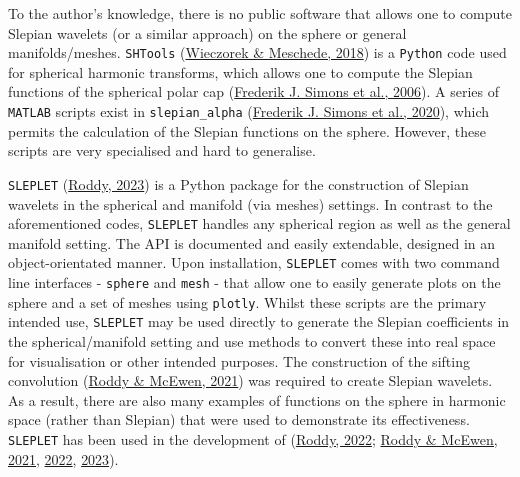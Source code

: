 \documentclass[
]{article}
\begin{document}
To the author's knowledge, there is no public software that allows one
to compute Slepian wavelets (or a similar approach) on the sphere or
general manifolds/meshes. \texttt{SHTools}
(\protect\hyperlink{ref-Wieczorek2018}{Wieczorek \& Meschede, 2018}) is
a \texttt{Python} code used for spherical harmonic transforms, which
allows one to compute the Slepian functions of the spherical polar cap
(\protect\hyperlink{ref-Simons2006}{Frederik J. Simons et al., 2006}). A
series of \texttt{MATLAB} scripts exist in \texttt{slepian\_alpha}
(\protect\hyperlink{ref-Simons2020}{Frederik J. Simons et al., 2020}),
which permits the calculation of the Slepian functions on the sphere.
However, these scripts are very specialised and hard to generalise.

\texttt{SLEPLET} (\protect\hyperlink{ref-Roddy2023a}{Roddy, 2023}) is a
Python package for the construction of Slepian wavelets in the spherical
and manifold (via meshes) settings. In contrast to the aforementioned
codes, \texttt{SLEPLET} handles any spherical region as well as the
general manifold setting. The API is documented and easily extendable,
designed in an object-orientated manner. Upon installation,
\texttt{SLEPLET} comes with two command line interfaces -
\texttt{sphere} and \texttt{mesh} - that allow one to easily generate
plots on the sphere and a set of meshes using \texttt{plotly}. Whilst
these scripts are the primary intended use, \texttt{SLEPLET} may be used
directly to generate the Slepian coefficients in the spherical/manifold
setting and use methods to convert these into real space for
visualisation or other intended purposes. The construction of the
sifting convolution (\protect\hyperlink{ref-Roddy2021}{Roddy \& McEwen,
2021}) was required to create Slepian wavelets. As a result, there are
also many examples of functions on the sphere in harmonic space (rather
than Slepian) that were used to demonstrate its effectiveness.
\texttt{SLEPLET} has been used in the development of
(\protect\hyperlink{ref-Roddy2022a}{Roddy, 2022};
\protect\hyperlink{ref-Roddy2021}{Roddy \& McEwen, 2021},
\protect\hyperlink{ref-Roddy2022}{2022},
\protect\hyperlink{ref-Roddy2023}{2023}).
\end{document}
